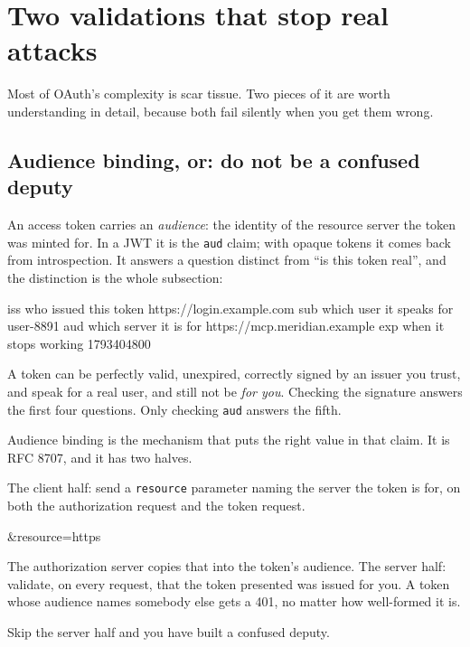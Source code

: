 \section{Two validations that stop real attacks}

Most of OAuth's complexity is scar tissue. Two pieces of it are worth understanding in detail, because both fail silently
when you get them wrong.

\subsection{Audience binding, or: do not be a confused deputy}
\label{sec:audience-binding}

An access token carries an \emph{audience}: the identity of the resource server
the token was minted for. In a JWT it is the \texttt{aud} claim; with opaque
tokens it comes back from introspection. It answers a question distinct from
``is this token real'', and the distinction is the whole subsection:

\begin{plain}
iss  who issued this token          https://login.example.com
sub  which user it speaks for       user-8891
aud  which server it is for         https://mcp.meridian.example
exp  when it stops working          1793404800
\end{plain}

A token can be perfectly valid, unexpired, correctly signed by an issuer you
trust, and speak for a real user, and still not be \emph{for you}. Checking the
signature answers the first four questions. Only checking \texttt{aud} answers
the fifth.

Audience binding is the mechanism that puts the right value in that claim. It is
RFC 8707, and it has two halves.

The client half: send a \texttt{resource} parameter naming the server the token
is for, on both the authorization request and the token request.

\begin{plain}
&resource=https%
\end{plain}

The authorization server copies that into the token's audience. The server half:
validate, on every request, that the token presented was issued for you. A token
whose audience names somebody else gets a 401, no matter how well-formed it is.

Skip the server half and you have built a confused deputy.

